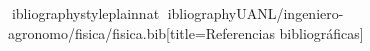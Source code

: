 \documentclass[spanish,letterpaper,oneside]{article}
\begin{document}
\hypersetup{pageanchor=false}
\begingroup
\fontsize{14}{17}\selectfont
\renewcommand{\Huge}{\fontsize{14}{17}\selectfont\bfseries}
\renewcommand{\large}{\fontsize{14}{17}\selectfont}
\templatePortrait
\clearpage
\endgroup
\hypersetup{pageanchor=true}
\templatePagecfg

\templateIndex
\clearpage
\templateFinalcfg
\setlength{\tabcolsep}{8pt}
\renewcommand{\arraystretch}{1.15}

\vspace{0.4cm}
\nocite{*}
\clearpage
ibliographystyle{plainnat}
ibliography{UANL/ingeniero-agronomo/fisica/fisica.bib}[title={Referencias bibliográficas}]
\end{document}
